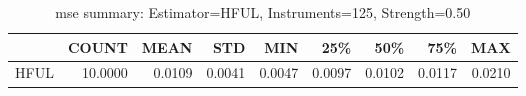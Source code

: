 \begin{table}[ht]
\centering
\caption{mse summary: Estimator=HFUL, Instruments=125, Strength=0.50}
\begin{tabular}{lrrrrrrrr}
\toprule
 & COUNT & MEAN & STD & MIN & 25\% & 50\% & 75\% & MAX \\
\midrule
HFUL & 10.0000 & 0.0109 & 0.0041 & 0.0047 & 0.0097 & 0.0102 & 0.0117 & 0.0210 \\
\bottomrule
\end{tabular}
\end{table}
